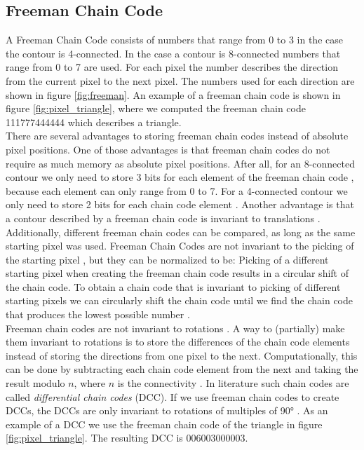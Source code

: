 \documentclass[thesis.tex]{subfiles}
\begin{document}
\subsection{Freeman Chain Code}
A Freeman Chain Code \cite{freeman} consists of numbers that range from 0 to 3 in the case the contour is 4-connected. In the case a contour is 8-connected numbers that range from 0 to 7 are used. For each pixel the number describes the direction from the current pixel to the next pixel. The numbers used for each direction are shown in figure \ref{fig:freeman}. An example of a freeman chain code is shown in figure \ref{fig:pixel_triangle}, where we computed the freeman chain code 111777444444 which describes a triangle. \\  
There are several advantages to storing freeman chain codes instead of absolute pixel positions. One of those advantages is that freeman chain codes do not require as much memory as absolute pixel positions. After all, for an 8-connected contour we only need to store 3 bits for each element of the freeman chain code \cite{Ballard:1982:CV:578131}, because each element can only range from 0 to 7. For a 4-connected contour we only need to store 2 bits for each chain code element \cite{Ballard:1982:CV:578131}. Another advantage is that a contour described by a freeman chain code is invariant to translations \cite{yang2008su}. Additionally, different freeman chain codes can be compared, as long as the same starting pixel was used. Freeman Chain Codes are not invariant to the picking of the starting pixel \cite{Ballard:1982:CV:578131}, but they can be normalized to be: Picking of a different starting pixel when creating the freeman chain code results in a circular shift of the chain code. To obtain a chain code that is invariant to picking of different starting pixels we can circularly shift the chain code until we find the chain code that produces the lowest possible number \cite{Ballard:1982:CV:578131}. \\  Freeman chain codes are not invariant to rotations \cite{yang2008su,Ballard:1982:CV:578131}. A way to (partially) make them invariant to rotations is to store the differences of the chain code elements instead of storing the directions from one pixel to the next. Computationally, this can be done by subtracting each chain code element from the next and taking the result modulo $n$, where $n$ is the connectivity \cite{yang2008su}. In literature such chain codes are called \textit{differential chain codes} (DCC). If we use freeman chain codes to create DCCs, the DCCs are only invariant to rotations of multiples of 90\si{\degree} \cite{yang2008su}. As an example of a DCC we use the freeman chain code of the triangle in figure \ref{fig:pixel_triangle}. The resulting DCC is 006003000003.\\
\end{document}
